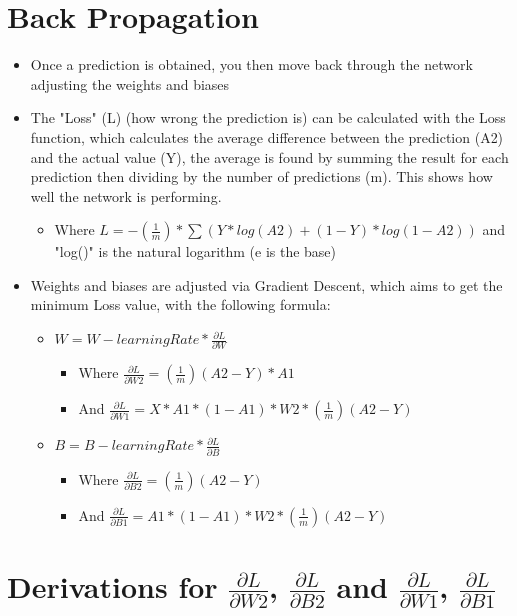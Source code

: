 \documentclass[10pt,a4paper]{article}
\begin{document}
\section{Back Propagation}

\begin{itemize}
    \item Once a prediction is obtained, you then move back through the network adjusting the weights and biases
    \item The "Loss" (L) (how wrong the prediction is) can be calculated with the Loss function, which calculates the average difference between the prediction (A2) and the actual value (Y), the average is found by summing the result for each prediction then dividing by the number of predictions (m). This shows how well the network is performing.
    \begin{itemize}
        \item Where $L = -(\frac{1}{m}) * \sum(Y * log(A2) + (1-Y) * log(1-A2))$ and "log()" is the natural logarithm (e is the base)
    \end{itemize}
    \item Weights and biases are adjusted via Gradient Descent, which aims to get the minimum Loss value, with the following formula:
    \begin{itemize}
        \item $W = W - learningRate * \frac{\partial{L}}{\partial{W}}$
        \begin{itemize}
            \item Where $\frac{\partial{L}}{\partial{W2}} = (\frac{1}{m})(A2-Y) * A1$
            \item And $\frac{\partial{L}}{\partial{W1}} = X * A1 * (1-A1) * W2 * (\frac{1}{m})(A2-Y)$
        \end{itemize}
        \item $B = B - learningRate * \frac{\partial{L}}{\partial{B}}$
        \begin{itemize}
            \item Where $\frac{\partial{L}}{\partial{B2}} = (\frac{1}{m})(A2-Y)$
            \item And $\frac{\partial{L}}{\partial{B1}} = A1 * (1-A1) * W2 * (\frac{1}{m})(A2-Y)$
        \end{itemize}
    \end{itemize}
\end{itemize}

\section{Derivations for $\frac{\partial{L}}{\partial{W2}}$, $\frac{\partial{L}}{\partial{B2}}$ and $\frac{\partial{L}}{\partial{W1}}$, $\frac{\partial{L}}{\partial{B1}}$}
\end{document}
